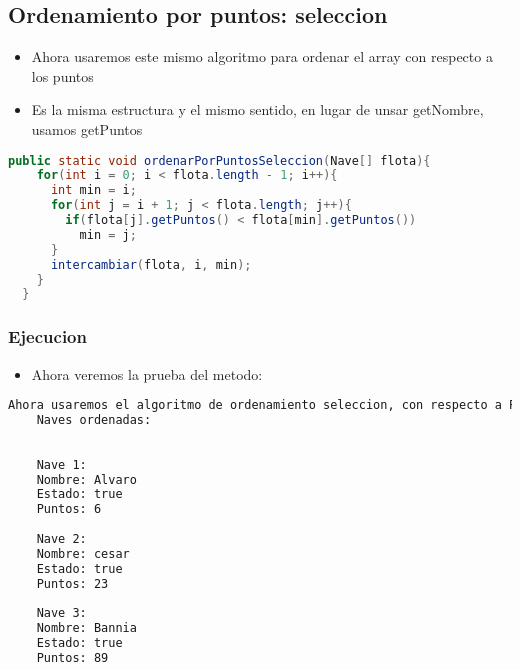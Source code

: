 \subsection{Ordenamiento por puntos: seleccion}
\begin{itemize}
    \item Ahora usaremos este mismo algoritmo para ordenar el array con respecto a los puntos
    \item Es la misma estructura y el mismo sentido, en lugar de unsar getNombre, usamos getPuntos
\end{itemize}
\begin{lstlisting}[language=java, caption={Metodo para ordenar por puntos}]
      public static void ordenarPorPuntosSeleccion(Nave[] flota){
    for(int i = 0; i < flota.length - 1; i++){
      int min = i;
      for(int j = i + 1; j < flota.length; j++){
        if(flota[j].getPuntos() < flota[min].getPuntos())
          min = j;
      }
      intercambiar(flota, i, min);
    }
  }
\end{lstlisting}
\subsubsection{Ejecucion}
\begin{itemize}
    \item Ahora veremos la prueba del metodo:
\end{itemize}
    \begin{lstlisting}[language=bash, caption={Prueba del metodo}]
    Ahora usaremos el algoritmo de ordenamiento seleccion, con respecto a Puntos.
    Naves ordenadas:
    
    
    Nave 1:
    Nombre: Alvaro
    Estado: true
    Puntos: 6
    
    Nave 2:
    Nombre: cesar
    Estado: true
    Puntos: 23
    
    Nave 3:
    Nombre: Bannia
    Estado: true
    Puntos: 89
      
\end{lstlisting}

